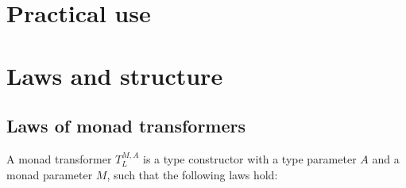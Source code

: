 \section{Practical use}

\section{Laws and structure}

\subsection{Laws of monad transformers\label{subsec:Laws-of-monad-transformers}}

A monad transformer $T_{L}^{M,A}$ is a type constructor with a type
parameter $A$ and a monad parameter $M$, such that the following
laws hold:
